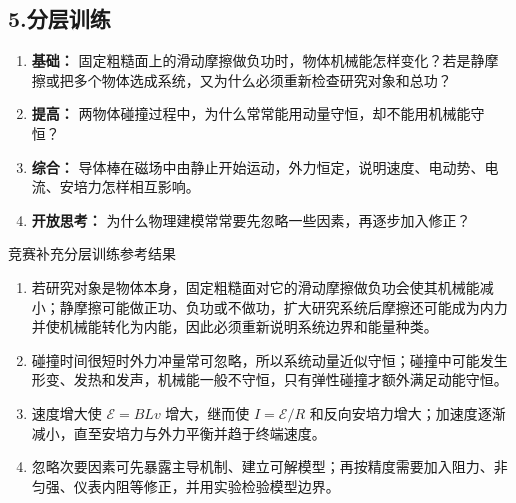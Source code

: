 \subsection*{5.\quad 分层训练}

\begin{enumerate}
  \item \textbf{基础：} 固定粗糙面上的滑动摩擦做负功时，物体机械能怎样变化？若是静摩擦或把多个物体选成系统，又为什么必须重新检查研究对象和总功？
  \item \textbf{提高：} 两物体碰撞过程中，为什么常常能用动量守恒，却不能用机械能守恒？
  \item \textbf{综合：} 导体棒在磁场中由静止开始运动，外力恒定，说明速度、电动势、电流、安培力怎样相互影响。
  \begin{center}
  
  \end{center}
  \item \textbf{开放思考：} 为什么物理建模常常要先忽略一些因素，再逐步加入修正？
\end{enumerate}

\begin{learningbox}{竞赛补充分层训练参考结果}
\begin{enumerate}[itemsep=0.45em,topsep=0.3em,parsep=0pt]
  \item 若研究对象是物体本身，固定粗糙面对它的滑动摩擦做负功会使其机械能减小；静摩擦可能做正功、负功或不做功，扩大研究系统后摩擦还可能成为内力并使机械能转化为内能，因此必须重新说明系统边界和能量种类。
  \item 碰撞时间很短时外力冲量常可忽略，所以系统动量近似守恒；碰撞中可能发生形变、发热和发声，机械能一般不守恒，只有弹性碰撞才额外满足动能守恒。
  \item 速度增大使 $\mathcal E=BLv$ 增大，继而使 $I=\mathcal E/R$ 和反向安培力增大；加速度逐渐减小，直至安培力与外力平衡并趋于终端速度。
  \item 忽略次要因素可先暴露主导机制、建立可解模型；再按精度需要加入阻力、非匀强、仪表内阻等修正，并用实验检验模型边界。
\end{enumerate}
\end{learningbox}

